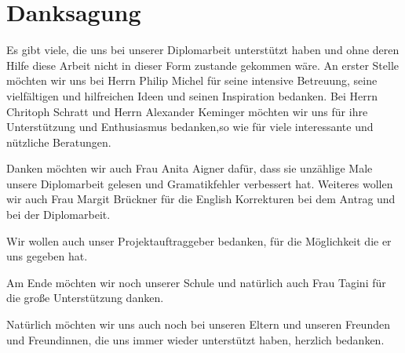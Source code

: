 %
%
\newpage

%
%
\section*{Danksagung}
Es gibt viele, die uns bei unserer Diplomarbeit unterst\"utzt haben und ohne deren Hilfe diese Arbeit nicht in dieser Form zustande gekommen w\"are.
An erster Stelle m\"ochten wir uns bei Herrn Philip Michel f\"ur seine intensive Betreuung, seine vielf\"altigen und hilfreichen Ideen und seinen Inspiration bedanken.
Bei Herrn Chritoph Schratt und Herrn Alexander Keminger  m\"ochten wir uns f\"ur ihre Unterst\"utzung und Enthusiasmus bedanken,so wie f\"ur viele interessante und n\"utzliche Beratungen.

Danken m\"ochten wir auch Frau Anita Aigner daf\"ur, dass sie unz\"ahlige Male unsere Diplomarbeit gelesen 
und Gramatikfehler verbessert hat. Weiteres wollen wir auch Frau Margit Br\"uckner f\"ur die English Korrekturen bei dem Antrag und bei der Diplomarbeit.

Wir wollen auch unser Projektauftraggeber bedanken, f\"ur die M\"oglichkeit die er uns gegeben hat.

Am Ende m\"ochten wir noch unserer Schule und nat\"urlich auch Frau Tagini f\"ur die gro{\ss}e Unterst\"utzung danken. 

Nat\"urlich m\"ochten wir uns auch noch bei unseren Eltern und unseren Freunden und Freundinnen, die uns 
immer wieder unterst\"utzt haben, herzlich bedanken.

\vspace{4cm}

